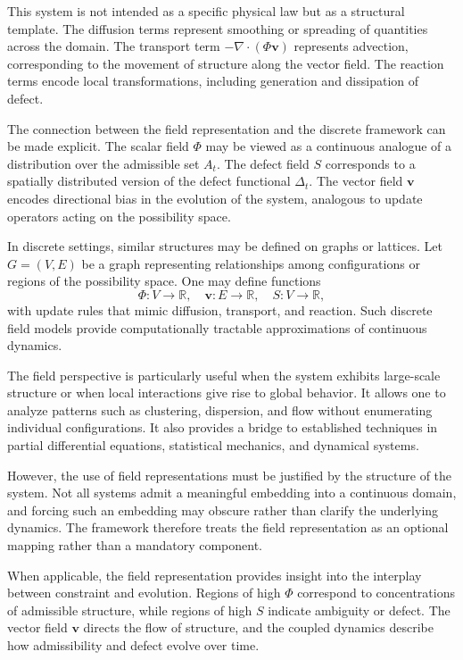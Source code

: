 \documentclass[11pt,oneside]{article}
\begin{document}
This system is not intended as a specific physical law but as a structural template. The diffusion terms represent smoothing or spreading of quantities across the domain. The transport term \( -\nabla \cdot (\Phi \mathbf{v}) \) represents advection, corresponding to the movement of structure along the vector field. The reaction terms encode local transformations, including generation and dissipation of defect.

The connection between the field representation and the discrete framework can be made explicit. The scalar field \( \Phi \) may be viewed as a continuous analogue of a distribution over the admissible set \( A_t \). The defect field \( S \) corresponds to a spatially distributed version of the defect functional \( \Delta_t \). The vector field \( \mathbf{v} \) encodes directional bias in the evolution of the system, analogous to update operators acting on the possibility space.

In discrete settings, similar structures may be defined on graphs or lattices. Let \( G = (V, E) \) be a graph representing relationships among configurations or regions of the possibility space. One may define functions
\[
\Phi : V \to \mathbb{R}, \quad \mathbf{v} : E \to \mathbb{R}, \quad S : V \to \mathbb{R},
\]
with update rules that mimic diffusion, transport, and reaction. Such discrete field models provide computationally tractable approximations of continuous dynamics.

The field perspective is particularly useful when the system exhibits large-scale structure or when local interactions give rise to global behavior. It allows one to analyze patterns such as clustering, dispersion, and flow without enumerating individual configurations. It also provides a bridge to established techniques in partial differential equations, statistical mechanics, and dynamical systems.

However, the use of field representations must be justified by the structure of the system. Not all systems admit a meaningful embedding into a continuous domain, and forcing such an embedding may obscure rather than clarify the underlying dynamics. The framework therefore treats the field representation as an optional mapping rather than a mandatory component.

When applicable, the field representation provides insight into the interplay between constraint and evolution. Regions of high \( \Phi \) correspond to concentrations of admissible structure, while regions of high \( S \) indicate ambiguity or defect. The vector field \( \mathbf{v} \) directs the flow of structure, and the coupled dynamics describe how admissibility and defect evolve over time.
\end{document}
